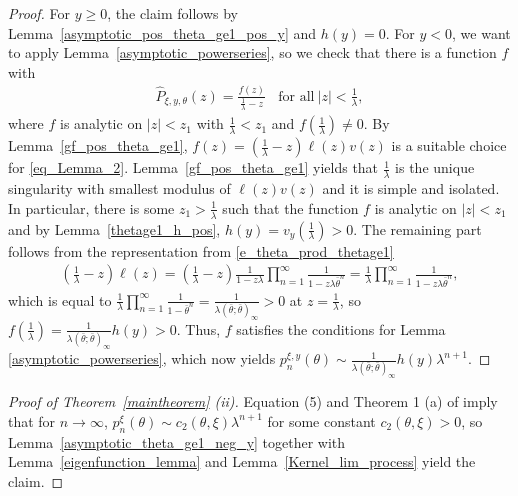 \documentclass[10pt,a4paper]{amsart}
\newcommand{\1}{\mathds{1}}
\begin{document}
\begin{proof}
   For $y\ge0$, the claim follows by Lemma~\ref{asymptotic_pos_theta_ge1_pos_y} and $h(y)=0$. For $y<0$, we want to apply Lemma~\ref{asymptotic_powerseries}, so we check that there is a function $f$ with
    \begin{align}
        \hat{P}_{\xi,y,\theta}(z)=\frac{f(z)}{\frac{1}{\lambda}-z}~~~~\text{for all}~|z|<\frac{1}{\lambda}\label{eq_Lemma_2},
    \end{align}
   where $f$ is analytic on $|z|<z_1$ with $\frac{1}{\lambda}<z_1$ and $f\left(\frac{1}{\lambda}\right)\neq 0$. 
   By Lemma~\ref{gf_pos_theta_ge1}, $f(z)=\left(\frac{1}{\lambda}-z\right)\ell(z)v(z)$  is a suitable choice for \eqref{eq_Lemma_2}. Lemma~\ref{gf_pos_theta_ge1} yields that $\frac{1}{\lambda}$ is the unique singularity with smallest modulus of $\ell(z)v(z)$ and it is simple and isolated. In particular, there is some $z_1>\frac{1}{\lambda}$ such that the function $f$ is analytic on $|z|<z_1$ and by Lemma~\ref{thetage1_h_pos}, $h(y)=v_y\left(\frac{1}{\lambda}\right)>0$. The remaining part follows from the representation from \eqref{e_theta_prod_thetage1}
   \begin{align*}
      \left(\frac{1}{\lambda}-z\right)\ell(z)=\left(\frac{1}{\lambda}-z\right)\frac{1}{1-z\lambda}\prod_{n=1}^\infty\frac{1}{1-z\lambda \bar\theta^n}=\frac{1}{\lambda}\prod_{n=1}^\infty\frac{1}{1-z\lambda \bar\theta^n},
   \end{align*}
   which is equal to $\frac{1}{\lambda}\prod_{n=1}^\infty\frac{1}{1-\bar\theta^n}=\frac{1}{\lambda(\bar\theta;\bar\theta)_\infty}>0$ at $z=\frac{1}{\lambda}$, so $f\left(\frac{1}{\lambda}\right)=\frac{1}{\lambda(\bar\theta;\bar\theta)_\infty}h(y)>0$.
  Thus, $f$ satisfies the  conditions for Lemma \ref{asymptotic_powerseries}, which now yields $p_n^{\xi,y}(\theta)\sim \frac{1}{\lambda(\bar\theta;\bar\theta)_\infty}h(y)\lambda^{n+1}$.
\end{proof}
\begin{proof}[Proof of Theorem~\ref{maintheorem} (ii)]
 Equation (5) and Theorem 1 (a) of \cite{AR}
 imply that for $n\to\infty$, $p_n^{\xi}(\theta)\sim c_2(\theta,\xi)\lambda^{n+1}$ for some constant $c_2(\theta,\xi)>0$,
       so Lemma~\ref{asymptotic_theta_ge1_neg_y} together with Lemma~\ref{eigenfunction_lemma} and Lemma~\ref{Kernel_lim_process} yield the claim.
\end{proof}
\end{document}
